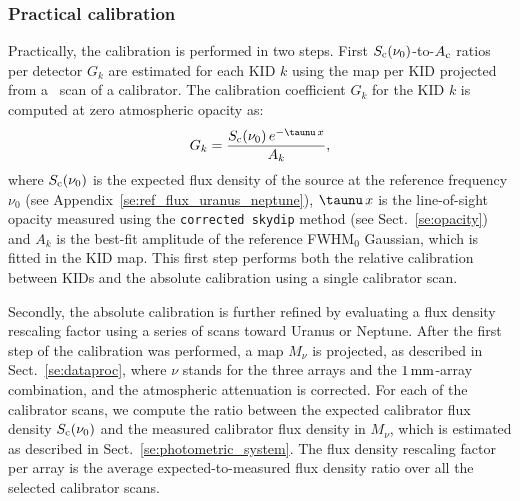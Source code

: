 \subsubsection{Practical calibration}
\label{se:practical_calib}

{\lp Practically, the calibration is performed in two steps. First
$S_{\rm{c}}(\nu_{0})$-to-$A_{\rm{c}}$ ratios per detector $G_k$
are estimated for each KID $k$ using the map per KID projected from
a \bm\ scan of a calibrator. The calibration coefficient $G_k$
for the KID $k$ is computed at zero atmospheric opacity as:
\begin{equation}
  G_k = \frac{S_{\rm{c}}(\nu_0)\, e^{-\taunu\,x}}{A_k},
  \label{eq:kid_gain}
\end{equation}
where $S_{\rm{c}}(\nu_0)$ is the expected flux density of the source at
the reference frequency $\nu_0$ (see
Appendix~\ref{se:ref_flux_uranus_neptune}), $\taunu\, x$ is the
line-of-sight opacity measured using the {\tt corrected skydip} method
(see Sect.~\ref{se:opacity}) and $A_k$ is the best-fit
amplitude of the reference FWHM$_0$ Gaussian, which is fitted in the
KID map. %
This first step performs both the relative calibration between KIDs and the absolute
calibration using a single calibrator scan.

Secondly, the absolute calibration is further refined by evaluating a
flux density rescaling factor using a series of scans toward
Uranus or Neptune. After the first step of the calibration was
performed, a map $M_\nu$ is projected, as
described in Sect.~\ref{se:dataproc}, where $\nu$ stands for the three
arrays and the $1\,\rm{mm}$-array combination, and the atmospheric attenuation
is corrected. For each of the calibrator scans, we
compute the ratio between the expected calibrator flux density
$S_{\rm{c}}(\nu_{0})$ and the measured calibrator flux density in $M_\nu$, which
is estimated as described in Sect.~\ref{se:photometric_system}. The
flux density rescaling factor per array is the average
expected-to-measured flux density ratio over all the selected calibrator scans.} 

%

